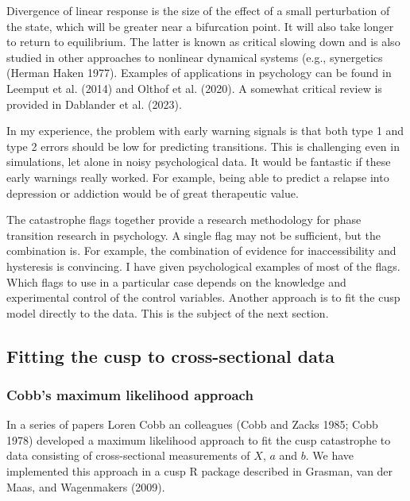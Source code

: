 \documentclass[
  a4paper,
  DIV=11,
  numbers=noendperiod]{scrreprt}
\begin{document}
Divergence of linear response is the size of the effect of a small
perturbation of the state, which will be greater near a bifurcation
point. It will also take longer to return to equilibrium. The latter is
known as critical slowing down and is also studied in other approaches
to nonlinear dynamical systems (e.g., synergetics (Herman Haken 1977).
Examples of applications in psychology can be found in Leemput et al.
(2014) and Olthof et al. (2020). A somewhat critical review is provided
in Dablander et al. (2023).

In my experience, the problem with early warning signals is that both
type 1 and type 2 errors should be low for predicting transitions. This
is challenging even in simulations, let alone in noisy psychological
data. It would be fantastic if these early warnings really worked. For
example, being able to predict a relapse into depression or addiction
would be of great therapeutic value.

The catastrophe flags together provide a research methodology for phase
transition research in psychology. A single flag may not be sufficient,
but the combination is. For example, the combination of evidence for
inaccessibility and hysteresis is convincing. I have given psychological
examples of most of the flags. Which flags to use in a particular case
depends on the knowledge and experimental control of the control
variables. Another approach is to fit the cusp model directly to the
data. This is the subject of the next section.

\hypertarget{sec-Fitting-the-cusp-to-crosssectional-data}{%
\subsection{Fitting the cusp to cross-sectional
data}\label{sec-Fitting-the-cusp-to-crosssectional-data}}

\hypertarget{sec-Cobbs-maximum-likelihood-approach}{%
\subsubsection{Cobb's maximum likelihood
approach}\label{sec-Cobbs-maximum-likelihood-approach}}

In a series of papers Loren Cobb an colleagues (Cobb and Zacks 1985;
Cobb 1978) developed a maximum likelihood approach to fit the cusp
catastrophe to data consisting of cross-sectional measurements of \(X\),
\(a\) and \(b\). We have implemented this approach in a cusp R package
described in Grasman, van der Maas, and Wagenmakers (2009).
\end{document}
